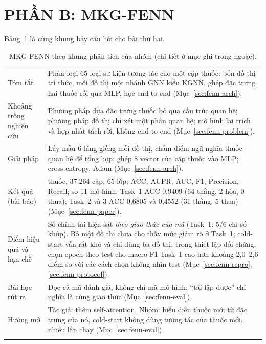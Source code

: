 \documentclass[conference]{IEEEtran}
\newcommand{\hlg}[1]{{\sethlcolor{hlgreen}\hl{#1}}}
\renewcommand{\hl}[1]{#1}
\begin{document}
\section*{PHẦN B: MKG-FENN}

Bảng~\ref{tab:frame-fenn} là cùng khung bảy câu hỏi cho bài thứ hai.

\begin{table}[t]
\caption{MKG-FENN theo khung phân tích của nhóm (chi tiết ở mục ghi trong ngoặc).}
\label{tab:frame-fenn}
\centering\footnotesize
\renewcommand{\arraystretch}{1.15}
\begin{tabular}{>{\raggedright\arraybackslash}p{1.95cm} >{\raggedright\arraybackslash}p{5.95cm}}
\toprule
Tóm tắt & Phân loại 65 loại sự kiện tương tác cho một cặp thuốc: bốn đồ thị tri thức, mỗi đồ thị một
nhánh GNN kiểu KGNN, ghép đặc trưng hai thuốc rồi qua MLP, học end-to-end
(Mục~\ref{sec:fenn-arch}). \\ \addlinespace[2pt]
Khoảng trống nghiên cứu & Phương pháp dựa đặc trưng thuốc bỏ qua cấu trúc quan hệ; phương pháp đồ thị chỉ xét
một phần quan hệ; mô hình lai trích và hợp nhất tách rời, không end-to-end
(Mục~\ref{sec:fenn-problem}). \\ \addlinespace[2pt]
Giải pháp & Lấy mẫu 6 láng giềng mỗi đồ thị, chấm điểm ngữ nghĩa thuốc--quan hệ để tổng hợp; ghép
8 vector của cặp thuốc vào MLP; cross-entropy, Adam (Mục~\ref{sec:fenn-arch}). \\ \addlinespace[2pt]
Kết quả (bài báo) & 572 thuốc, 37.264 cặp, 65 lớp; ACC, AUPR, AUC, F1, Precision, Recall; so 11 mô
hình. Task~1 ACC 0,9409 (64 thắng, 2 hòa, 0 thua); Task~2 và 3 ACC 0,6805 và 0,4552 (31 thắng, 5
thua) (Mục~\ref{sec:fenn-paper}). \\ \addlinespace[2pt]
Điểm hiệu quả và hạn chế & \hlg{Số chính tái hiện sát} \emph{theo giao thức của mã} \hlg{(Task~1: 5/6 chỉ số khớp). Bỏ một đồ thị chưa cho thấy mức giảm rõ ở}
Task~1; cold-start vẫn rất khó và chỉ dùng ba đồ thị; \hlg{trong thiết lập đối chứng, chọn epoch theo test cho macro-F1 Task~1
cao hơn} khoảng 2,0--2,6 điểm so với các cách chọn không nhìn test (Mục~\ref{sec:fenn-repro}, \ref{sec:fenn-protocol}). \\ \addlinespace[2pt]
Bài học rút ra & Đọc cả mã đánh giá, không chỉ mã mô hình; ``tái lập được'' chỉ nghĩa là cùng giao thức
(Mục~\ref{sec:fenn-eval}). \\ \addlinespace[2pt]
Hướng mở & Tác giả: thêm self-attention. Nhóm: biểu diễn thuốc mới từ đặc trưng của nó, cold-start
không dùng tương tác của thuốc mới, nhiều lần chạy (Mục~\ref{sec:fenn-eval}). \\ \addlinespace[2pt]
\bottomrule
\end{tabular}
\end{table}
\end{document}
